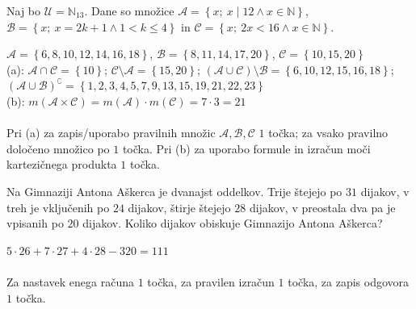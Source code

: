\documentclass[addpoints]{exam}
\begin{document}
\begin{questions}
    \newpage

    \question
    Naj bo $\mathcal{U}=\mathbb{N}_{13}$. Dane so množice $\mathcal{A}=\left\{x;\ x\mid 12 \land x\in\mathbb{N}\right\}$, $\mathcal{B}=\left\{x;\ x=2k+1 \land 1< k\leq 4\right\}$ in $\mathcal{C}=\left\{x;\ 2x<16 \land x\in\mathbb{N}\right\}$. 

    \begin{solution}[14cm]
        $\mathcal{A}=\left\{6,8,10,12,14,16,18\right\}$, $\mathcal{B}=\left\{8,11,14,17,20\right\}$, $\mathcal{C}=\left\{10,15,20\right\}$ \\
        (a): $\mathcal{A}\cap\mathcal{C}=\left\{10\right\}$; $\mathcal{C}\setminus\mathcal{A}=\left\{15,20\right\}$; $(\mathcal{A}\cup\mathcal{C})\setminus\mathcal{B}=\left\{6,10,12,15,16,18\right\}$; $(\mathcal{A}\cup\mathcal{B})^\complement=\left\{1,2,3,4,5,7,9,13,15,19,21,22,23\right\}$ \\
        (b): $m(\mathcal{A}\times\mathcal{C})=m(\mathcal{A})\cdot m(\mathcal{C})=7\cdot 3 = 21$ \\ \\
        Pri (a) za zapis/uporabo pravilnih množic $\mathcal{A}, \mathcal{B}, \mathcal{C}$ $1$ točka; za vsako pravilno določeno množico po $1$ točka. Pri (b) za uporabo formule in izračun moči kartezičnega produkta $1$ točka.
    \end{solution}


        

    \question[3]
    Na Gimnaziji Antona Aškerca je dvanajst oddelkov. Trije štejejo po $31$ dijakov, v treh je vključenih po $24$ dijakov, štirje štejejo $28$ dijakov,
    v preostala dva pa je vpisanih po $20$ dijakov.
    Koliko dijakov obiskuje Gimnazijo Antona Aškerca?

    \begin{solution}[4cm]
        $5\cdot 26+7\cdot 27+4\cdot 28-320=111$ \\ \\
        Za nastavek enega računa $1$ točka, za pravilen izračun $1$ točka, za zapis odgovora $1$ točka.
    \end{solution}



    
\end{questions}
\end{document}
